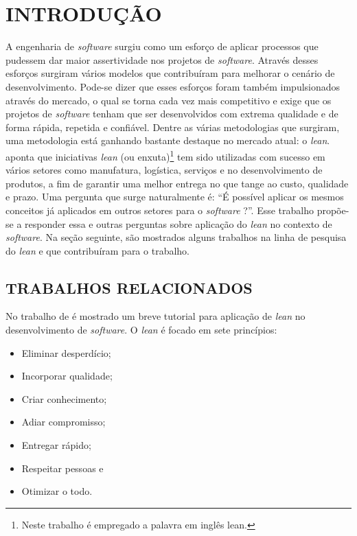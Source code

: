 \setcounter{page}{1}
\chapter{INTRODU\c{C}\~AO}  %
\label{chap:01}
A engenharia de \textit{software} surgiu como um esforço de aplicar processos que pudessem dar maior assertividade nos projetos de \textit{software}. Através desses esforços surgiram vários modelos que contribuíram para melhorar o cenário de desenvolvimento. Pode-se dizer que esses esforços foram também impulsionados através do mercado, o qual se torna cada vez mais competitivo e exige que os projetos de \textit{software} tenham que ser desenvolvidos com extrema qualidade e de forma rápida, repetida e confiável.
Dentre as várias metodologias que surgiram, uma metodologia está ganhando bastante destaque no mercado atual: o \textit{lean}.  aponta que iniciativas \textit{lean} (ou enxuta)\footnote{Neste trabalho é empregado a palavra em inglês lean.}  tem sido utilizadas com sucesso em vários setores como manufatura, logística, serviços e no desenvolvimento de produtos, a fim de garantir uma melhor entrega no que tange ao custo, qualidade e prazo. Uma pergunta que surge naturalmente é: “É possível aplicar os mesmos conceitos já aplicados em outros setores para o \textit{software} ?”. Esse trabalho propõe-se a responder essa e outras perguntas sobre aplicação do \textit{lean} no contexto de \textit{software}.
Na seção seguinte, são mostrados alguns trabalhos na linha de pesquisa do \textit{lean} e que contribuíram para o trabalho.

\section{TRABALHOS RELACIONADOS}

No trabalho  de  é mostrado um breve tutorial para aplicação de \textit{lean} no desenvolvimento de \textit{software}. O \textit{lean} é focado em sete princípios:

\begin{itemize}
	\item Eliminar desperdício;
	\item Incorporar qualidade;
	\item	Criar conhecimento;
	\item	Adiar compromisso;
	\item	Entregar rápido;
	\item	Respeitar pessoas e
	\item	Otimizar o todo.
\end{itemize}

